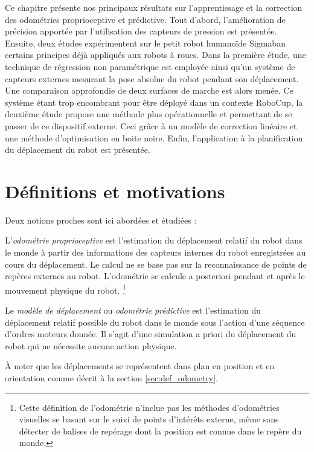 

Ce chapitre présente nos principaux résultats sur l'apprentissage et la correction 
des odométries proprioceptive et prédictive.
Tout d'abord, l'amélioration de précision apportée par l'utilisation 
des capteurs de pression est présentée.
Ensuite, deux études expérimentent sur le petit robot humanoïde Sigmaban
certains principes déjà appliqués aux robots à roues.
Dans la première étude, une technique de régression non paramétrique est employée
ainsi qu'un système de capteurs externes mesurant la pose absolue 
du robot pendant son déplacement.
Une comparaison approfondie de deux surfaces de marche est alors menée.
Ce système étant trop encombrant pour être déployé dans un contexte RoboCup,
la deuxième étude propose une méthode plus opérationnelle et permettant 
de se passer de ce dispositif externe. 
Ceci grâce à un modèle de correction linéaire et une méthode d'optimisation en boite noire.
Enfin, l'application à la planification du déplacement du robot est présentée.

\section{Définitions et motivations\label{sec:odometry_intro}}

Deux notions proches sont ici abordées et étudiées :
\begin{definition}
    L'\textit{odométrie proprioceptive} est l'estimation 
    du déplacement relatif du robot
    dans le monde à partir des informations des capteurs 
    internes du robot enregistrées au cours du déplacement.
    Le calcul ne se base pas sur la reconnaissance 
    de points de repères externes au robot.
    L'odométrie se calcule a posteriori pendant et après 
    le mouvement physique du robot.
    \footnote{Cette définition de l'odométrie n'inclue pas les méthodes 
    d'odométries visuelles se basant sur le suivi de
    points d'intérêts externe, même sans détecter de balises 
    de repérage dont la position est connue dans le repère du monde.}
\end{definition}
\begin{definition}
    Le \textit{modèle de déplacement} ou \textit{odométrie prédictive} 
    est l'estimation du déplacement relatif possible du robot
    dans le monde sous l'action d'une séquence d'ordres moteurs donnée. 
    Il s'agit d'une simulation a priori du déplacement du robot qui
    ne nécessite aucune action physique.
\end{definition}
À noter que les déplacements se représentent dans plan en position et 
en orientation comme décrit à la section \ref{sec:def_odometry}.\\


